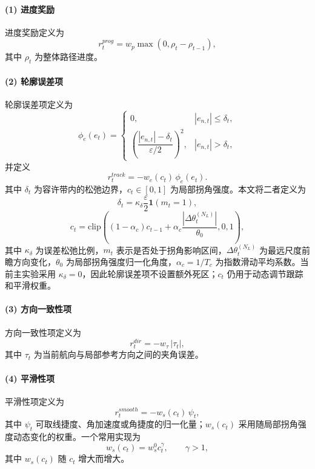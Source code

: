 \documentclass[preprint,12pt]{elsarticle}
\begin{document}
\paragraph{(1) 进度奖励} 进度奖励定义为
\begin{equation}
 r_t^{prog}=w_p\max(0,\rho_t-\rho_{t-1}),
\end{equation}
其中 $\rho_t$ 为整体路径进度。

\paragraph{(2) 轮廓误差项} 轮廓误差项定义为
\begin{equation}
\phi_e(e_t)=
\begin{cases}
0, & |e_{n,t}|\leq \delta_t,\\[4pt]
\left(\dfrac{|e_{n,t}|-\delta_t}{\varepsilon/2}\right)^2, & |e_{n,t}|>\delta_t,
\end{cases}
\end{equation}
并定义
\begin{equation}
 r_t^{track}=-w_e(c_t)\,\phi_e(e_t).
\end{equation}
其中 $\delta_t$ 为容许带内的松弛边界，$c_t\in[0,1]$ 为局部拐角强度。本文将二者定义为
\begin{equation}
\delta_t=\kappa_{\delta}\frac{\varepsilon}{2}\mathbf{1}(m_t=1),
\end{equation}
\begin{equation}
c_t=\mathrm{clip}\left((1-\alpha_c)c_{t-1}+\alpha_c\frac{|\Delta\theta^{(N_L)}_t|}{\theta_0},0,1\right),
\end{equation}
其中 $\kappa_{\delta}$ 为误差松弛比例，$m_t$ 表示是否处于拐角影响区间，$\Delta\theta^{(N_L)}_t$ 为最远尺度前瞻方向变化，$\theta_0$ 为局部拐角强度归一化角度，$\alpha_c=1/T_c$ 为指数滑动平均系数。当前主实验采用 $\kappa_{\delta}=0$，因此轮廓误差项不设置额外死区；$c_t$ 仍用于动态调节跟踪和平滑权重。

\paragraph{(3) 方向一致性项} 方向一致性项定义为
\begin{equation}
 r_t^{dir}=-w_{\tau}\,|\tau_t|,
\end{equation}
其中 $\tau_t$ 为当前航向与局部参考方向之间的夹角误差。

\paragraph{(4) 平滑性项} 平滑性项定义为
\begin{equation}
 r_t^{smooth}=-w_s(c_t)\,\psi_t,
\end{equation}
其中 $\psi_t$ 可取线捷度、角加速度或角捷度的归一化量；$w_s(c_t)$ 采用随局部拐角强度动态变化的权重。一个常用实现为
\begin{equation}
 w_s(c_t)=w_s^0 c_t^{\gamma}, \qquad \gamma>1,
\end{equation}
其中 $w_s(c_t)$ 随 $c_t$ 增大而增大。
\end{document}
